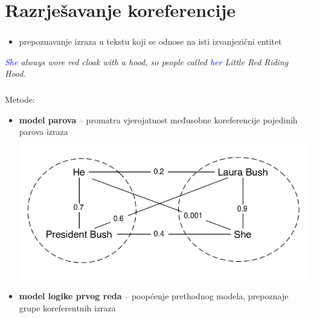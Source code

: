 \documentclass[t, xcolor={usenames,dvipsnames,svgnames,table}]{beamer}
\begin{document}
	
\section{Razrješavanje koreferencije}
	
	\begin{frame}
		\sectionpage
	\end{frame}
	
	\begin{frame}
		\frametitle{\secname}
		
		\begin{itemize}
			\item	prepoznavanje izraza u tekstu koji se odnose na isti izvanjezični entitet
		\end{itemize}
		
		\bigskip
		
		\begin{displayquote}
			\textit{\textcolor{Blue}{She} always wore red cloak with a hood, so people called \textcolor{Blue}{her} \textcolor{BrickRed}{Little Red Riding Hood}.}
		\end{displayquote}
	\end{frame}
	
	\begin{frame}
		\frametitle{\secname}
		
		Metode:
		\begin{itemize}
			\item 	\textbf{model parova} -- promatra vjerojatnost međusobne koreferencije pojedinih parova izraza \\
					\includegraphics[scale = 0.3]{coreference_example.png}
			\item 	\textbf{model logike prvog reda} -- poopćenje prethodnog modela, prepoznaje grupe koreferentnih izraza
					
		\end{itemize}
					
	\end{frame}
	
\end{document}

